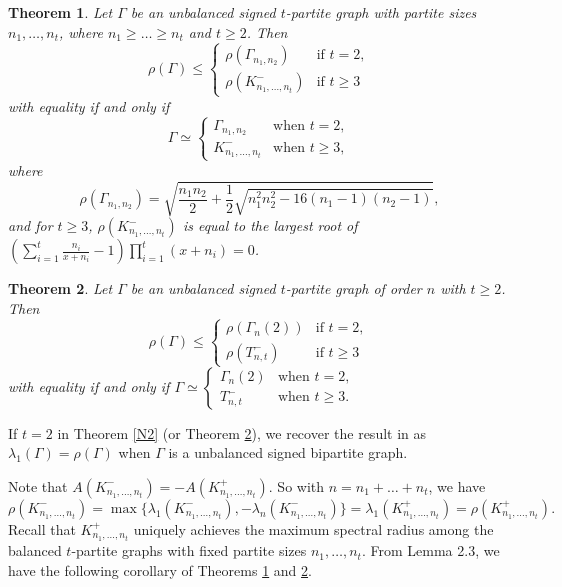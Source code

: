 \documentclass[12pt]{article}
\numberwithin{equation}{section}
\newtheorem {Theorem} {Theorem}[section]
\begin{document}
%
%



\begin{Theorem}\label{N5}
Let $\Gamma$ be an unbalanced signed $t$-partite graph with partite sizes $n_1, \dots, n_t$, where $n_1\ge \dots\ge n_t$ and $t\ge 2$. Then
\[
\rho(\Gamma)\le 
\begin{cases}
\rho(\Gamma_{n_1,n_2}) & \mbox{if $t=2$}, \\
\rho(K_{n_1, \dots, n_t}^-) & \mbox{if $t\ge 3$}
\end{cases}
	\]
with equality if and only if 
\[
\Gamma\simeq \begin{cases}
\Gamma_{n_1,n_2} &  \mbox{when $t=2$},\\
K_{n_1, \dots, n_t}^{-} &  \mbox{when $t\ge 3$},
\end{cases}
\]
where
\[
\rho(\Gamma_{n_1,n_2})=\sqrt{\frac{n_1n_2}{2}+\frac{1}{2}\sqrt{n_1^2n_2^2-16(n_1-1)(n_2-1)}},
\]
and for $t\ge 3$, 
$\rho(K_{n_1, \dots, n_t}^-)$ is equal to the largest root of $\left(\sum_{i=1}^t\frac{n_i}{x+n_i}-1\right)\prod_{i=1}^t(x+n_i)=0$.
\end{Theorem}









\begin{Theorem}\label{N6}
	Let $\Gamma$ be an unbalanced signed $t$-partite graph of order $n$ with $t\ge 2$. Then
	\[
	\rho(\Gamma)\le \begin{cases} \rho(\Gamma_n(2)) & \mbox{if $t=2$},\\
\rho (T_{n, t}^-) & \mbox{if $t\ge 3$}
\end{cases}
	\]
	with equality if and only if $\Gamma\simeq \begin{cases} 
\Gamma_n(2) & \mbox{when $t=2$},\\ 
T_{n, t}^- &  \mbox{when $t\ge 3$}.
\end{cases}$
\end{Theorem}


If $t=2$ in Theorem \ref{N2} (or Theorem \ref{N6}), we recover the result in \cite{CDG} as  $\lambda_1(\Gamma)=\rho(\Gamma)$ when $\Gamma$ is a unbalanced signed bipartite graph. 

Note that  $A(K_{n_1, \dots, n_t}^-)=-A(K_{n_1, \dots, n_t}^+)$. So with $n=n_1+\dots+n_t$, we have 
\[
\rho (K_{n_1, \dots, n_t}^-) =\max\{\lambda_1(K_{n_1, \dots, n_t}^-), -\lambda_n(K_{n_1, \dots, n_t}^-)\}=\lambda_1(K_{n_1, \dots, n_t}^+)
=\rho(K_{n_1, \dots, n_t}^+).
\] 
Recall that  $K_{n_1, \dots, n_t}^+$ uniquely achieves the maximum spectral radius among the balanced $t$-partite graphs with fixed partite sizes $n_1,\dots, n_t$.  From Lemma 2.3,  we have the following corollary of Theorems \ref{N5} and \ref{N6}.
\end{document}

